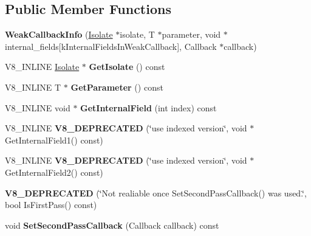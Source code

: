 \subsection*{Public Member Functions}
\begin{DoxyCompactItemize}
\item 
{\bfseries Weak\+Callback\+Info} (\hyperlink{classv8_1_1_isolate}{Isolate} $\ast$isolate, T $\ast$parameter, void $\ast$internal\+\_\+fields\mbox{[}k\+Internal\+Fields\+In\+Weak\+Callback\mbox{]}, Callback $\ast$callback)\hypertarget{classv8_1_1_weak_callback_info_a0863d1a5dba908ef4ac42298be4ee402}{}\label{classv8_1_1_weak_callback_info_a0863d1a5dba908ef4ac42298be4ee402}

\item 
V8\+\_\+\+I\+N\+L\+I\+NE \hyperlink{classv8_1_1_isolate}{Isolate} $\ast$ {\bfseries Get\+Isolate} () const \hypertarget{classv8_1_1_weak_callback_info_a5f0fe68cc18853467d3713b1ec48da9a}{}\label{classv8_1_1_weak_callback_info_a5f0fe68cc18853467d3713b1ec48da9a}

\item 
V8\+\_\+\+I\+N\+L\+I\+NE T $\ast$ {\bfseries Get\+Parameter} () const \hypertarget{classv8_1_1_weak_callback_info_a515eb1547d96a9813e447e8acfb46a1a}{}\label{classv8_1_1_weak_callback_info_a515eb1547d96a9813e447e8acfb46a1a}

\item 
V8\+\_\+\+I\+N\+L\+I\+NE void $\ast$ {\bfseries Get\+Internal\+Field} (int index) const \hypertarget{classv8_1_1_weak_callback_info_ac14e2ded95ad11763a5fdf601e69e004}{}\label{classv8_1_1_weak_callback_info_ac14e2ded95ad11763a5fdf601e69e004}

\item 
V8\+\_\+\+I\+N\+L\+I\+NE {\bfseries V8\+\_\+\+D\+E\+P\+R\+E\+C\+A\+T\+ED} (\char`\"{}use indexed version\char`\"{}, void $\ast$Get\+Internal\+Field1() const)\hypertarget{classv8_1_1_weak_callback_info_a3e5c3c00672dc02931fea46129432e80}{}\label{classv8_1_1_weak_callback_info_a3e5c3c00672dc02931fea46129432e80}

\item 
V8\+\_\+\+I\+N\+L\+I\+NE {\bfseries V8\+\_\+\+D\+E\+P\+R\+E\+C\+A\+T\+ED} (\char`\"{}use indexed version\char`\"{}, void $\ast$Get\+Internal\+Field2() const)\hypertarget{classv8_1_1_weak_callback_info_a8eec746a3a9435af3ef0555c454f780b}{}\label{classv8_1_1_weak_callback_info_a8eec746a3a9435af3ef0555c454f780b}

\item 
{\bfseries V8\+\_\+\+D\+E\+P\+R\+E\+C\+A\+T\+ED} (\char`\"{}Not realiable once Set\+Second\+Pass\+Callback() was used.\char`\"{}, bool Is\+First\+Pass() const)\hypertarget{classv8_1_1_weak_callback_info_a619bad43989c80ac8cbba4ecfa37d8d9}{}\label{classv8_1_1_weak_callback_info_a619bad43989c80ac8cbba4ecfa37d8d9}

\item 
void {\bfseries Set\+Second\+Pass\+Callback} (Callback callback) const \hypertarget{classv8_1_1_weak_callback_info_a17590c561d242f1250b4cd4020eb8cd7}{}\label{classv8_1_1_weak_callback_info_a17590c561d242f1250b4cd4020eb8cd7}

\end{DoxyCompactItemize}
